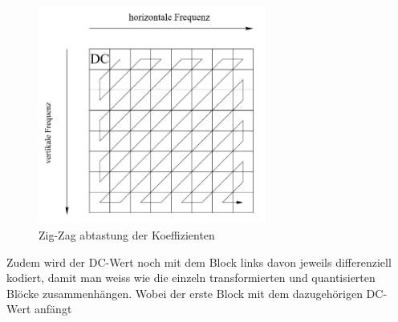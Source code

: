 \begin{figure}
    \centering
    \includegraphics[width=75mm]{papers/jpeg/pictures/zigzag.pdf}
    \caption{Zig-Zag abtastung der Koeffizienten
        \label{jpeg:fig:zigzag}}
\end{figure}

Zudem wird der DC-Wert noch mit dem Block links davon jeweils differenziell kodiert, damit man weiss wie die einzeln transformierten und quantisierten Blöcke zusammenhängen.
Wobei der erste Block mit dem dazugehörigen DC-Wert anfängt
